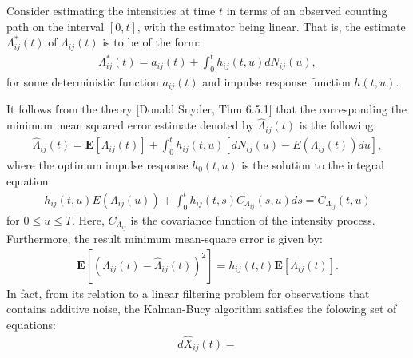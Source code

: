 \documentclass[12pt]{article}%
\begin{document}
Consider estimating the intensities at time $t$ in terms of an observed counting path on the interval $[0,t]$,
with the estimator being linear.  That is, the estimate $\Lambda_{ij}^{*}(t)$ of $\Lambda_{ij}(t)$ is to be of 
the form:
\begin{eqnarray}
\Lambda_{ij}^{*}(t) = a_{ij}(t) + \int_0^t h_{ij}(t,u) dN_{ij}(u),
\end{eqnarray}
for some deterministic function $a_{ij}(t)$ and impulse response function $h(t,u)$.  

It follows from the theory [Donald Snyder, Thm 6.5.1] that the corresponding the minimum mean squared error estimate
denoted by $\widehat{\Lambda}_{ij}(t)$ is the following:
\begin{eqnarray}
\widehat{\Lambda}_{ij}(t) = \mathbf E[\Lambda_{ij}(t)] + \int_0^t h_{ij}(t,u)\left[dN_{ij}(u) - E(\Lambda_{ij}(t))du\right],
\end{eqnarray}
where the optimum impulse response $h_0(t,u)$ is the solution to the integral equation:
\begin{eqnarray}
h_{ij}(t,u) E(\Lambda_{ij}(u)) 
+
\int_0^t h_{ij}(t,s) C_{\Lambda_{ij}}(s,u) ds = C_{\Lambda_{ij}}(t,u)
\end{eqnarray}
for $0 \le u \le T$.  Here, $C_{\Lambda_{ij}}$ is the covariance function of the intensity process.  Furthermore,
the result minimum mean-square error is given by:
\begin{eqnarray}
\mathbf E[(\Lambda_{ij}(t) - \widehat{\Lambda}_{ij}(t))^2] = h_{ij}(t,t) \mathbf E[\Lambda_{ij}(t)]. 
\end{eqnarray}
In fact, from its relation to a linear filtering problem 
for observations that contains additive noise, the Kalman-Bucy algorithm satisfies
the folowing set of equations:
\begin{eqnarray}
d\widehat{X}_{ij}(t)  = 
\end{eqnarray}
\end{document}
